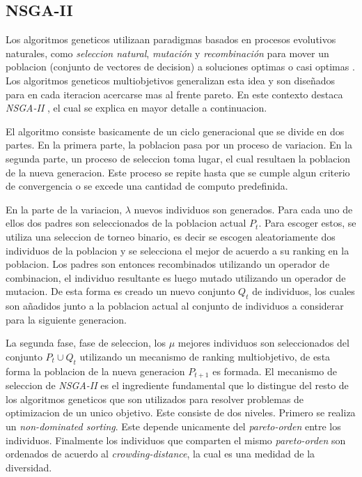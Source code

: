 \subsection{NSGA-II}

Los algoritmos geneticos utilizaan paradigmas basados en procesos evolutivos naturales, como \textit{seleccion natural}, \textit{mutaci\'on} y \textit{recombinaci\'on} para mover un poblacion (conjunto de vectores de decision) a soluciones optimas o casi optimas \parencite{back1996evolutionary}. Los algoritmos geneticos multiobjetivos generalizan esta idea y son diseñados para en cada iteracion acercarse mas al frente pareto. En este contexto destaca \emph{NSGA-II} \parencite{deb2002nsgaii}, el cual se explica en mayor detalle a continuacion.

El algoritmo consiste basicamente de un ciclo generacional que se divide en dos partes. En la primera parte, la poblacion pasa por un proceso de variacion. En la segunda parte, un proceso de seleccion toma lugar, el cual resultaen la poblacion de la nueva generacion. Este proceso se repite hasta que se cumple algun criterio de convergencia o se excede una cantidad de computo predefinida.

En la parte de la variacion, $\lambda$ nuevos individuos son generados. Para cada uno de ellos dos padres son seleccionados de la poblacion actual $P_t$. Para escoger estos, se utiliza una seleccion de torneo binario, es decir se escogen aleatoriamente dos individuos de la poblacion y se selecciona el mejor de acuerdo a su ranking en la poblacion. Los padres son entonces recombinados utilizando un operador de combinacion, el individuo resultante es luego mutado utilizando un operador de mutacion. De esta forma es creado un nuevo conjunto $Q_t$ de individuos, los cuales son añadidos junto a la poblacion actual al conjunto de individuos a considerar para la siguiente generacion.

La segunda fase, fase de seleccion, los $\mu$ mejores individuos son seleccionados del conjunto $P_t \cup Q_t$ utilizando un mecanismo de ranking multiobjetivo, de esta forma la poblacion de la nueva generacion $P_{t+1}$ es formada. El mecanismo de seleccion de \emph{NSGA-II} es el ingrediente fundamental que lo distingue del resto de los algoritmos geneticos que son utilizados para resolver problemas de optimizacion de un unico objetivo. Este consiste de dos niveles. Primero se realiza un \emph{non-dominated sorting}. Este depende unicamente del \emph{pareto-orden} entre los individuos. Finalmente los individuos que comparten el mismo \emph{pareto-orden} son ordenados de acuerdo al \emph{crowding-distance}, la cual es una medidad de la diversidad.

